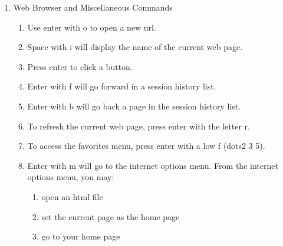 \documentclass[10pt,letterpaper,twoside]{report}
\begin{document}
{{{{\begin{enumerate}
\begin{enumerate}
		      \item Press enter to begin the search.  You may also just press enter after you write in the search edit box.
		            
		      \item Use space to move forward by link.  Move back by link by pressing backspace.  Explore the results of your search.  Press enter on a link to open the url. Use the web browser and miscellaneous commands listed here. Practice as necessary.
	      \end{enumerate}
	\item Web Browser and Miscellaneous Commands
	      
	      \begin{enumerate}
		      \item Use enter with o to open a new url.
		            
		      \item Space with i will display the name of the current web page.
		            
		      \item Press enter to click a button.
		            
		      \item Enter with f will go forward in a session history list.
		            
		      \item Enter with b will go back a page in the session history list.
		            
		      \item To refresh the current web page, press enter with the letter r.
		            
		      \item To access the favorites menu, press enter with a low f (dots2 3 5).
		            
		      \item Enter with m will go to the internet options menu.  From the internet options menu, you may:
		            
		            \begin{enumerate}
			            \item open an html file
			                  
			            \item set the current page as the home page
			                  
			            \item go to your home page
			                  

\end{enumerate}
\end{enumerate}
\end{enumerate}}}}}
\end{document}
